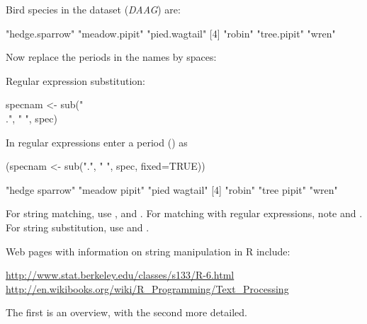 Bird species in the dataset  ({\em DAAG}) are:
\begin{Schunk}
\begin{Soutput}
[1] "hedge.sparrow" "meadow.pipit"  "pied.wagtail" 
[4] "robin"         "tree.pipit"    "wren"         
\end{Soutput}
\end{Schunk}
Now replace the periods in the names by spaces:
\begin{marginfigure}[18pt]
Regular expression substitution:
\begin{Schunk}
\begin{Sinput}
specnam <- sub("\\.",
               " ", spec)
\end{Sinput}
\end{Schunk}
\noindent
In regular expressions enter a period () as
\end{marginfigure}
\begin{Schunk}
\begin{Sinput}
(specnam <- sub(".", " ", spec, fixed=TRUE))
\end{Sinput}
\begin{Soutput}
[1] "hedge sparrow" "meadow pipit"  "pied wagtail" 
[4] "robin"         "tree pipit"    "wren"         
\end{Soutput}
\end{Schunk}

For string matching, use ,  and
.  For matching with regular expressions, note
 and .  For string substitution, use
 and .

Web pages with information on string
manipulation in R include:\\[3pt]
\begin{fullwidth}
\small
\noindent
\url{http://www.stat.berkeley.edu/classes/s133/R-6.html}\\[3pt]

\noindent
\url{http://en.wikibooks.org/wiki/R_Programming/Text_Processing}\\[3pt]
\end{fullwidth}
\noindent
The first is an overview, with the second more detailed.

